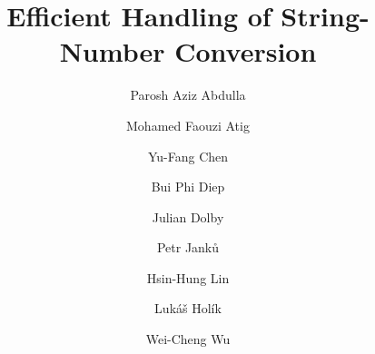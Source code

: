 \documentclass[sigplan,screen]{acmart}
\title{Efficient Handling of String-Number Conversion}
\author{Parosh Aziz Abdulla}
\affiliation{
  \institution{Uppsala University}
    \state{Uppsala}
     \country{Sweden}                    %
}
\author{Mohamed Faouzi Atig}
\affiliation{
  \institution{Uppsala University}
      \state{Uppsala}
    \country{Sweden}                    %
}
\author{Yu-Fang Chen}
\affiliation{
  \institution{Academia Sinica}
      \state{Taipei}
    \country{Taiwan}                    %
}
\author{Bui Phi Diep}
\affiliation{
  \institution{Uppsala University}
      \state{Uppsala}
    \country{Sweden}                    %
}
\author{Julian Dolby}
\affiliation{
  \institution{IBM Research}
      \state{NY}
    \country{USA}                    %
}
\author{Petr Janků}
\affiliation{
  \institution{Brno University of Technology}
      \state{Brno}
    \country{Czechia}                    %
}
\author{Hsin-Hung Lin}
\affiliation{
  \institution{Academia Sinica}
      \state{Taipei}
    \country{Taiwan}                    %
}
\author{Lukáš Holík}
\affiliation{
  \institution{Brno University of Technology}
      \state{Brno}
    \country{Czechia}                    %
}
\author{Wei-Cheng Wu}
\affiliation{
  \institution{University of Southern California}
      \state{CA}
    \country{USA}                    %
}
\begin{document}
\newcommand{\hide}[1]{}
\newcommand{\tool}{{\textsf{Z3-Trau}}}
\newcommand{\dr}{\mathcal{R}}
\newcommand{\nat}{\mathbb{N}}
\newcommand{\integers}{\mathbb{Z}}
\newcommand{\todo}[1]{{\color{blue}TODO: #1}}
\newcommand{\lh}[1]{{\color{orange}Lukas: #1}}
\newcommand{\changed}[1]{{\color{blue}#1}}

\newcommand{\yfc}[1]{{\color{blue}YFC: #1}}
\newcommand{\petr}[1]{{\color{pink}Petr: #1}}
\newcommand{\chatAt}[2]{\mbox{\textsf{charAt}($#1$, $#2$)}}
\newcommand{\ite}[3]{\mbox{\textsf{ite}($#1$, $#2$, $#3$)}}
\newcommand{\sti}[1]{\mbox{\textsf{toNum}($#1$)}}
\newcommand{\its}[1]{\mbox{\textsf{toStr}($#1$)}}
\newcommand{\varn}{\mbox{$Z$}}
\newcommand{\vars}{\mbox{$X$}}
\newcommand{\cvars}{\mbox{$\mathbb{V}_{\Sigma_\epsilon}$}}
\newcommand{\pvars}{\mbox{$\mathbb{V}_{\sharp}$}}
\newcommand{\cvarone}{V}
\newcommand{\cvartwo}{V'}
\newcommand{\cvar}{V}
\newcommand{\modelsof}[1]{[\![#1]\!]}
\newcommand{\true}{\mbox{$\mathsf{true}$}}
\newcommand{\false}{\mbox{$\mathsf{false}$}}
\newcommand{\enc}[1]{[\![#1]\!]}
\newcommand{\parikhof}[1]{\mathbb{P}{(#1)}}
\newcommand{\parikhwof}[2]{|#1|_{#2}}
\newcommand{\semof}[1]{\modelsof{#1}}
\newcommand{\decode}[1]{\mathit{decode_{#1}}}
\newcommand{\parikhfof}[1]{\Phi_{\mathbb{P}}(#1)} %
\newcommand{\pim}{I_{\#}}
\newcommand{\syncop}{\times}
\newcommand{\syncof}[2]{#1 \syncop #2}
\newcommand{\syncfof}[2]{\Psi_{\syncof {#1} {#2}}}
\newcommand{\syncT}{T_\syncop}
\newcommand{\pvarsof}[1]{\#{#1}}
\newcommand{\pvar}{\pvarsof V}
\newcommand{\pvarone}{\pvarsof V}
\newcommand{\pvartwo}{\pvarsof {V'}}
\newcommand{\defeq}{::=}
\newcommand{\encode}[1]{\mathit{encode}_{#1}}
\newcommand{\eqwrt}[1]{=_{#1}}
\newcommand{\iequiv}{\equiv}
\newcommand{\restrict}[2]{#1_{#2}}
\newcommand{\underf}[2]{\mathit{flatten}_#1(#2)}
\newcommand{\paf}{\psi}

\newcommand\pa{P}
\newcommand{\leftA}{\pa^{\mathit{left}}}
\newcommand{\rightA}{\pa^{\mathit{right}}}
\newcommand{\leftV}{V^{\mathit{left}}}
\newcommand{\rightV}{V^{\mathit{right}}}
\newcommand\renvars{V_\dr^\mathsf{ver}}
\end{document}
